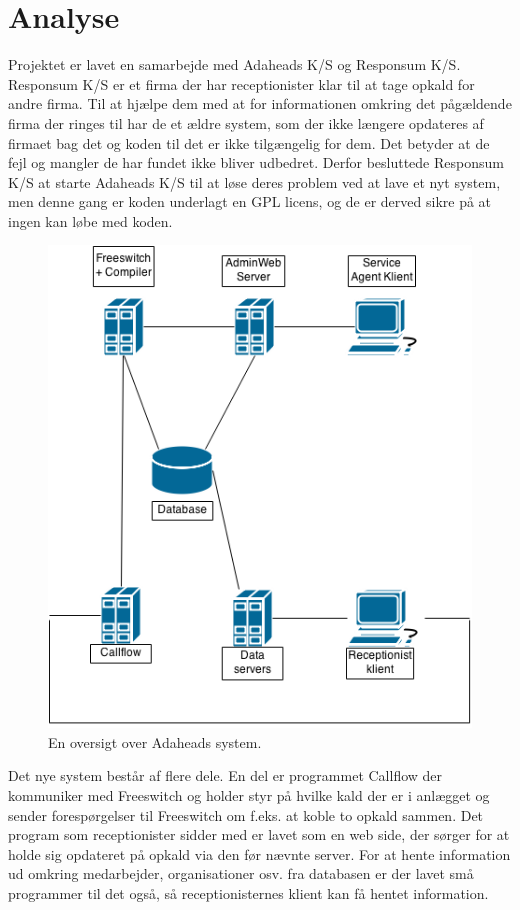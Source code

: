 \chapter{Analyse}

Projektet er lavet en samarbejde med Adaheads K/S og Responsum K/S. Responsum K/S er et firma der har receptionister klar til at tage opkald for andre firma. Til at hjælpe dem med at for informationen omkring det pågældende firma der ringes til har de et ældre system, som der ikke længere opdateres af firmaet bag det og koden til det er ikke tilgængelig for dem. Det betyder at de fejl og mangler de har fundet ikke bliver udbedret. Derfor besluttede Responsum K/S at starte Adaheads K/S til at løse deres problem ved at lave et nyt system, men denne gang er koden underlagt en GPL licens, og de er derved sikre på at ingen kan løbe med koden.

\begin{figure}[ht!]
\centering
\includegraphics[scale=0.5]{images/adaheads_system.png}
\caption{En oversigt over Adaheads system.}
\label{fig:adaheadssystem}
\end{figure}
Det nye system består af flere dele. En del er programmet Callflow der kommuniker med Freeswitch og holder styr på hvilke kald der er i anlægget og sender forespørgelser til Freeswitch om f.eks. at koble to opkald sammen. Det program som receptionister sidder med er lavet som en web side, der sørger for at holde sig opdateret på opkald via den før nævnte server. For at hente information ud omkring medarbejder, organisationer osv. fra databasen er der lavet små programmer til det også, så receptionisternes klient kan få hentet information.

